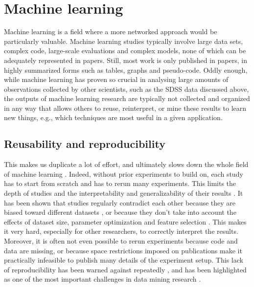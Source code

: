 \documentclass{acmproc-sp}
\begin{document}
\section{Machine learning}
\label{related}
Machine learning is a field where a more networked approach would be particularly valuable. Machine learning studies typically involve large data sets, complex code, large-scale evaluations and complex models, none of which can be adequately represented in papers. Still, most work is only published in papers, in highly summarized forms such as tables, graphs and pseudo-code. Oddly enough, while machine learning has proven so crucial in analysing large amounts of observations collected by other scientists, such as the SDSS data discussed above, the outputs of machine learning research are typically not collected and organized in any way that allows others to reuse, reinterpret, or mine these results to learn new things, e.g., which techniques are most useful in a given application.

\subsection{Reusability and reproducibility}
This makes us duplicate a lot of effort, and ultimately slows down the whole field of machine learning \cite{Vanschoren12,Hand:2006p14305}. Indeed, without prior experiments to build on, each study has to start from scratch and has to rerun many experiments. This limits the depth of studies and the interpretability and generalizability of their results \cite{Aha:1992p455,Hand:2006p14305}. It has been shown that studies regularly contradict each other because they are biased toward different datasets \cite{Keogh:2003p4930}, or because they don't take into account the effects of dataset size, parameter optimization and feature selection \cite{Perlich:2003p12674,Hoste:2005p12719}. This makes it very hard, especially for other researchers, to correctly interpret the results. Moreover, it is often not even possible to rerun experiments because code and data are missing, or because space restrictions imposed on publications make it practically infeasible to publish many details of the experiment setup. This lack of reproducibility has been warned against repeatedly \cite{Keogh:2003p4930,Sonnenburg:2007p12564,Pedersen:2008p12980}, and has been highlighted as one of the most important challenges in data mining research \cite{Hirsh:2008p14360}.

\end{document}
